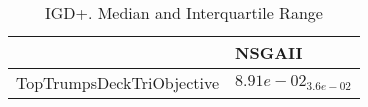 \documentclass{article}
\begin{document}
\begin{table}
\caption{IGD+. Median and Interquartile Range}
\label{table: IGD+}
\centering
\begin{scriptsize}
\begin{tabular}{ll}
\hline &  NSGAII\\
\hline 
TopTrumpsDeckTriObjective & \cellcolor{gray95}$  8.91e-02_{ 3.6e-02}$ \\
\hline
\end{tabular}
\end{scriptsize}
\end{table}
\end{document}
